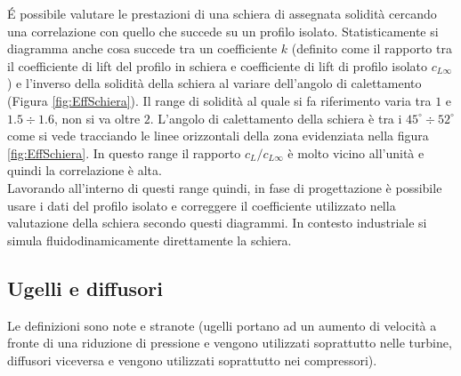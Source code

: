 \'E possibile valutare le prestazioni di una schiera di assegnata solidità cercando una correlazione con quello che succede su un profilo isolato. Statisticamente si diagramma anche cosa succede tra un coefficiente $k$ (definito come il rapporto tra il coefficiente di lift del profilo in schiera e coefficiente di lift di profilo isolato $c_{L \infty}$) e l'inverso della solidità della schiera al variare dell'angolo di calettamento (Figura \ref{fig:EffSchiera}). Il range di solidità al quale si fa riferimento varia tra $1$ e $ 1.5 \div 1.6$, non si va oltre $2$. L'angolo di calettamento della schiera è tra i $45^{\circ} \div 52^{\circ}$ come si vede tracciando le linee orizzontali della zona evidenziata nella figura \ref{fig:EffSchiera}. In questo range il rapporto $c_L / c_{L \infty}$ è molto vicino all'unità e quindi la correlazione è alta.\\
Lavorando all'interno di questi range quindi, in fase di progettazione è possibile usare i dati del profilo isolato e correggere il coefficiente utilizzato nella valutazione della schiera secondo questi diagrammi. In contesto industriale si simula fluidodinamicamente direttamente la schiera.
\subsection{Ugelli e diffusori}
Le definizioni sono note e stranote (ugelli portano ad un aumento di velocità a fronte di una riduzione di pressione e vengono utilizzati soprattutto nelle turbine, diffusori viceversa e vengono utilizzati soprattutto nei compressori). 


